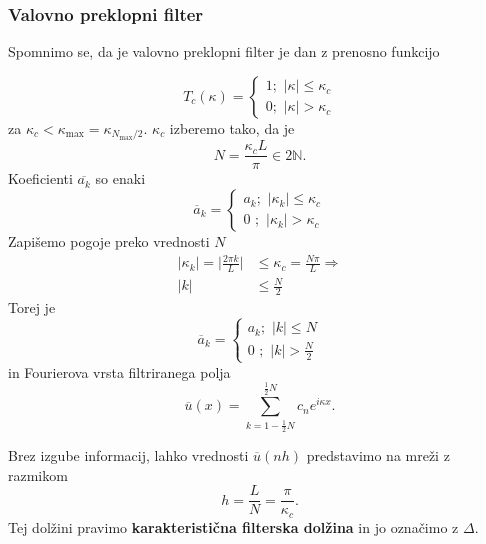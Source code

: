 \documentclass[mat2, tisk]{fmfdelo}
\newcommand{\N}{\mathbb N}
\begin{document}
\subsubsection{Valovno preklopni filter}

Spomnimo se, da je valovno preklopni filter je dan z prenosno funkcijo 

$$
T_c(\kappa)=\left\{\begin{array}{l}
  1 ;\,\, |\kappa| \leq \kappa_c \\
  0 ;\,\, |\kappa| > \kappa_c
\end{array}\right.
$$
za $\kappa_c < \kappa_\text{max} = \kappa_{N_\text{max}/2}$. $\kappa_c$
izberemo tako, da je 
$$
N = \frac{\kappa_c L}{\pi} \in 2\N.
$$
Koeficienti $\overline{a_k}$ so enaki 
$$
\overline{a}_k=\left\{\begin{array}{l}
  a_k ;\,\, |\kappa_k| \leq \kappa_c \\
  0 \,\,;\,\, |\kappa_k| > \kappa_c
\end{array}\right.
$$
Zapišemo pogoje preko vrednosti $N$
\begin{align*}
|\kappa_k| = \Big| \frac{2\pi k}{L} \Big| &\leq \kappa_c = \frac{N\pi}{L} \Longrightarrow\\[1mm]
|k| &\leq \frac{N}{2}
\end{align*}
Torej je
$$
\overline{a}_k=\left\{\begin{array}{l}
  a_k ;\,\, |k| \leq N \\
  0 \,\,;\,\, |k| > \frac{N}{2}
\end{array}\right.
$$
in Fourierova vrsta filtriranega polja 
\begin{equation}
\overline{u}(x) = \sum_{k = 1 - \frac{1}{2}N}^{\frac{1}{2}N} c_n e^{i\kappa x}.
\end{equation}

Brez izgube informacij, lahko vrednosti $\overline{u}(nh)$ predstavimo na mreži 
z razmikom 
\begin{equation}
h = \frac{L}{N} = \frac{\pi}{\kappa_c}.
\end{equation}
Tej dolžini pravimo \textbf{karakteristična filterska dolžina} in jo 
označimo z $\Delta$.
\end{document}
